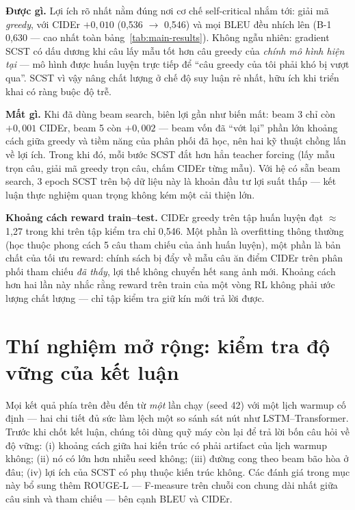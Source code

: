 \textbf{Được gì.} Lợi ích rõ nhất nằm đúng nơi cơ chế self-critical nhắm tới:
giải mã \emph{greedy}, với CIDEr $+0{,}010$ (0,536 $\to$ 0,546) và mọi BLEU đều
nhích lên (B-1 0,630 --- cao nhất toàn bảng~\ref{tab:main-results}). Không
ngẫu nhiên: gradient SCST có dấu dương khi câu lấy mẫu tốt hơn câu greedy của
\emph{chính mô hình hiện tại} --- mô hình được huấn luyện trực tiếp để ``câu
greedy của tôi phải khó bị vượt qua''. SCST vì vậy nâng chất lượng ở chế độ suy
luận rẻ nhất, hữu ích khi triển khai có ràng buộc độ trễ.

\textbf{Mất gì.} Khi đã dùng beam search, biên lợi gần như biến mất: beam 3 chỉ
còn $+0{,}001$ CIDEr, beam 5 còn $+0{,}002$ --- beam vốn đã ``vớt lại'' phần
lớn khoảng cách giữa greedy và tiềm năng của phân phối đã học, nên hai kỹ thuật
chồng lấn về lợi ích. Trong khi đó, mỗi bước SCST đắt hơn hẳn teacher forcing
(lấy mẫu trọn câu, giải mã greedy trọn câu, chấm CIDEr từng mẫu). Với hệ có sẵn
beam search, 3 epoch SCST trên bộ dữ liệu này là khoản đầu tư lợi suất thấp ---
kết luận thực nghiệm quan trọng không kém một cải thiện lớn.

\textbf{Khoảng cách reward train--test.} CIDEr greedy trên tập huấn luyện đạt
$\approx$1,27 trong khi trên tập kiểm tra chỉ 0,546. Một phần là overfitting
thông thường (học thuộc phong cách 5 câu tham chiếu của ảnh huấn luyện), một
phần là bản chất của tối ưu reward: chính sách bị đẩy về mẫu câu ăn điểm CIDEr
trên phân phối tham chiếu \emph{đã thấy}, lợi thế không chuyển hết sang ảnh
mới. Khoảng cách hơn hai lần này nhắc rằng reward trên train của một vòng RL
không phải ước lượng chất lượng --- chỉ tập kiểm tra giữ kín mới trả lời được.

\section{Thí nghiệm mở rộng: kiểm tra độ vững của kết luận}
\label{sec:ext}

Mọi kết quả phía trên đều đến từ \emph{một} lần chạy (seed 42) với một lịch
warmup cố định --- hai chi tiết đủ sức làm lệch một so sánh sát nút như
LSTM--Transformer. Trước khi chốt kết luận, chúng tôi dùng quỹ máy còn lại để
trả lời bốn câu hỏi về độ vững: (i) khoảng cách giữa hai kiến trúc có phải
artifact của lịch warmup không; (ii) nó có lớn hơn nhiễu seed không; (iii)
đường cong theo beam bão hòa ở đâu; (iv) lợi ích của SCST có phụ thuộc kiến
trúc không. Các đánh giá trong mục này bổ sung thêm ROUGE-L
\autocite{lin2004rouge} --- F-measure trên chuỗi con chung dài nhất giữa câu
sinh và tham chiếu --- bên cạnh BLEU và CIDEr.

